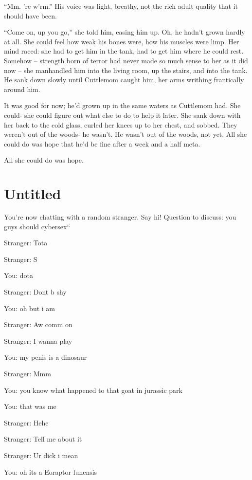 \documentclass[a1paper]{article}
\begin{document}
\begin{multicols}{7}
{“Mm.  're w'rm.”  His voice was light, breathy, not the rich adult quality that it should have been.

“Come on, up you go,” she told him, easing him up.  Oh, he hadn't grown hardly at all.  She could feel how weak his bones were, how his muscles were limp.  Her mind raced:  she had to get him in the tank, had to get him where he could rest.  Somehow – strength born of terror had never made so much sense to her as it did now – she manhandled him into the living room, up the stairs, and into the tank.  He sank down slowly until Cuttlemom caught him, her arms writhing frantically around him.

It was good for now; he'd grown up in the same waters as Cuttlemom had.  She could- she could figure out what else to do to help it later.  She sank down with her back to the cold glass, curled her knees up to her chest, and sobbed.  They weren't out of the woods- he wasn't.  He wasn't out of the woods, not yet.  All she could do was hope that he'd be fine after a week and a half meta.

All she could do was hope.








\section{Untitled}
You're now chatting with a random stranger. Say hi!
Question to discuss:
you guys should cybersex``

Stranger: Tota

\setlength{\parskip}{0.0em}
Stranger: S

You: dota

Stranger: Dont b shy

You: oh but i am

Stranger: Aw comm on

Stranger: I wanna play

You: my penis is a dinosaur

Stranger: Mmm

You: you know what happened to that goat in jurassic park

You: that was me

Stranger: Hehe

Stranger: Tell me about it

Stranger: Ur dick i mean

You: oh its a Eoraptor lunensis

}
\end{multicols}
\end{document}

